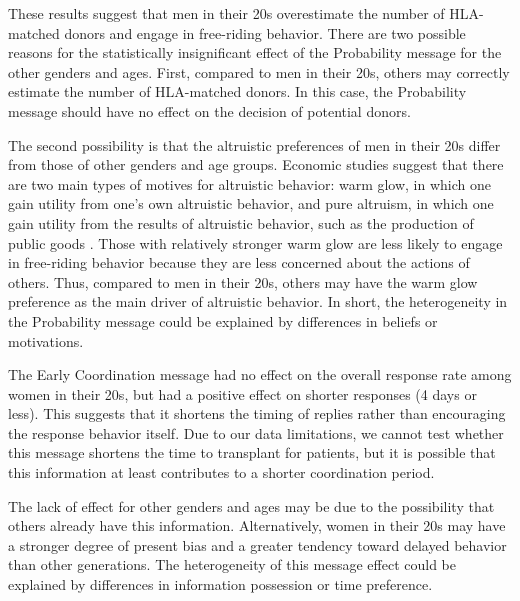 \documentclass[
]{article}
\begin{document}
These results suggest that men in their 20s overestimate the number of HLA-matched donors and engage in free-riding behavior. There are two possible reasons for the statistically insignificant effect of the Probability message for the other genders and ages. First, compared to men in their 20s, others may correctly estimate the number of HLA-matched donors. In this case, the Probability message should have no effect on the decision of potential donors.

The second possibility is that the altruistic preferences of men in their 20s differ from those of other genders and age groups. Economic studies suggest that there are two main types of motives for altruistic behavior: warm glow, in which one gain utility from one's own altruistic behavior, and pure altruism, in which one gain utility from the results of altruistic behavior, such as the production of public goods \citep{Andreoni1990}. Those with relatively stronger warm glow are less likely to engage in free-riding behavior because they are less concerned about the actions of others. Thus, compared to men in their 20s, others may have the warm glow preference as the main driver of altruistic behavior. In short, the heterogeneity in the Probability message could be explained by differences in beliefs or motivations.

The Early Coordination message had no effect on the overall response rate among women in their 20s, but had a positive effect on shorter responses (4 days or less). This suggests that it shortens the timing of replies rather than encouraging the response behavior itself. Due to our data limitations, we cannot test whether this message shortens the time to transplant for patients, but it is possible that this information at least contributes to a shorter coordination period.

The lack of effect for other genders and ages may be due to the possibility that others already have this information. Alternatively, women in their 20s may have a stronger degree of present bias and a greater tendency toward delayed behavior than other generations. The heterogeneity of this message effect could be explained by differences in information possession or time preference.
\end{document}
